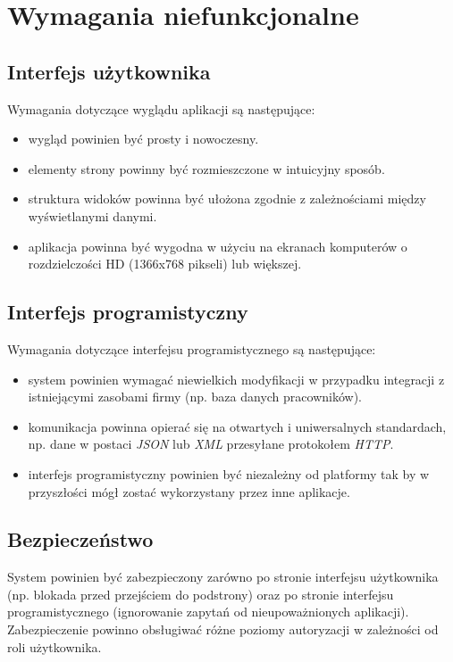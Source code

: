\documentclass[eng,printmode,openany]{mgr}
\begin{document}
	\section{Wymagania niefunkcjonalne}
	\subsection{Interfejs użytkownika}
	Wymagania dotyczące wyglądu aplikacji są następujące:
	\begin{itemize}
		\item wygląd powinien być prosty i nowoczesny.
		\item elementy strony powinny być rozmieszczone w intuicyjny sposób.
		\item struktura widoków powinna być ułożona zgodnie z zależnościami między wyświetlanymi danymi.
		\item aplikacja powinna być wygodna w użyciu na ekranach komputerów o rozdzielczości HD (1366x768 pikseli) lub większej.
	\end{itemize}
	\newpage
	\subsection{Interfejs programistyczny}
	Wymagania dotyczące interfejsu programistycznego są następujące:
	\begin{itemize}
		\item system powinien wymagać niewielkich modyfikacji w przypadku integracji z istniejącymi zasobami firmy (np. baza danych pracowników).
		\item komunikacja powinna opierać się na otwartych i uniwersalnych standardach, np. dane w postaci \textit{JSON} lub \textit{XML} przesyłane protokołem \textit{HTTP}.
		\item interfejs programistyczny powinien być niezależny od platformy tak by w przyszłości mógł zostać wykorzystany przez inne aplikacje.
	\end{itemize}
	\subsection{Bezpieczeństwo}
	System powinien być zabezpieczony zarówno po stronie interfejsu użytkownika (np. blokada przed przejściem do podstrony) oraz po stronie interfejsu programistycznego (ignorowanie zapytań od nieupoważnionych aplikacji). Zabezpieczenie powinno obsługiwać różne poziomy autoryzacji w zależności od roli użytkownika.
	
	\newpage
\end{document}
